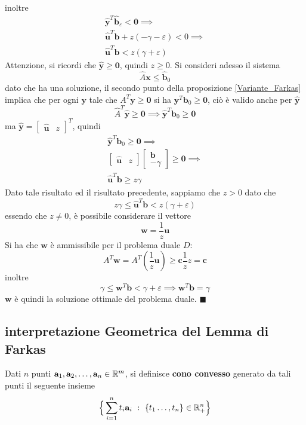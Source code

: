 \documentclass[10pt, letterpaper]{report}
\newcommand{\bb}{{\mathbf{b}}}
\newcommand{\bc}{{\mathbf{c}}}
\newcommand{\x}{{\mathbf{x}}}
\newcommand{\y}{{\mathbf{y}}}
\begin{document}
inoltre \begin{eqnarray}
    \hat\y^T\hat\bb_\varepsilon<\mathbf 0\implies \\
    \hat{\mathbf u}^T\bb+z(-\gamma-\varepsilon)<0 \implies \\ 
    \hat{\mathbf u}^T\bb<z(\gamma+\varepsilon)
\end{eqnarray}
Attenzione, si ricordi che $\hat\y\ge\mathbf 0$, quindi $z\ge 0$. Si consideri adesso il sistema 
$$\hat A\x\le \hat\bb_0$$
dato che ha una soluzione, il secondo punto della proposizione \ref{Variante_Farkas} implica che per ogni $\y$ tale che $A^T\y\ge \mathbf 0$ si ha $\y^T\bb_0\ge\mathbf 0$, ciò è valido anche per $\hat\y$ 
$$ 
\hat A^T\hat\y\ge\mathbf 0 \implies \hat\y^T\bb_0\ge \mathbf 0
$$
ma $ \hat\y = \begin{bmatrix}
    \hat{\mathbf u} & z 
\end{bmatrix}^T$, quindi 
\begin{eqnarray}
    \hat\y^T\bb_0\ge \mathbf 0\implies \\ 
    \begin{bmatrix}
        \hat{\mathbf u} & z 
    \end{bmatrix}\begin{bmatrix}
        \mathbf b \\ -\gamma 
    \end{bmatrix}\ge\mathbf 0\implies \\ 
    \hat{\mathbf u}^T\mathbf b \ge z\gamma
\end{eqnarray}
Dato tale risultato ed il risultato precedente, sappiamo che $z>0$ dato che 
\begin{equation}
    z\gamma\le \hat{\mathbf u}^T\bb<z(\gamma+\varepsilon)
\end{equation} 
essendo che $z\ne 0$, è possibile considerare il vettore $$\mathbf w = \frac{1}{z}\mathbf u$$
Si ha che $\mathbf w$ è ammissibile per il problema duale $D$:
$$ 
A^T\mathbf w = A^T(\frac{1}{z}\mathbf u)\ge \bc\frac{1}{z}z=\bc
$$
inoltre 
$$ \gamma\le\mathbf w^T\bb <\gamma+\varepsilon \implies\mathbf w^T\bb=\gamma$$
$\mathbf w$ è quindi la soluzione ottimale del problema duale. \hfill$\blacksquare$
\subsection{interpretazione Geometrica del Lemma di Farkas}
\begin{definizione}
    Dati $n$ punti $\mathbf a_1,\mathbf a_2,\dots, \mathbf a_n \in {\mathbb R}^m$, si definisce \textbf{cono convesso} generato da tali punti il seguente insieme 
    $$ 
    \Big\{\sum_{i=1}^n t_i\mathbf a_i \ : \ \{t_1\dots,t_n\}\in\R^n_+\Big\}
    $$
\end{definizione}
\end{document}
